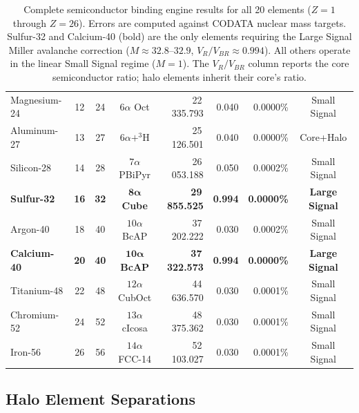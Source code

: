 \begin{table}[htbp]
\begin{tabular}{l c c c r r r c}
    Magnesium-24 & 12 & 24 & $6\alpha$ Oct     & 22\,335.793 & 0.040 & 0.0000\% & Small Signal \\
    Aluminum-27  & 13 & 27 & $6\alpha + ^3$H   & 25\,126.501 & 0.040 & 0.0000\% & Core+Halo \\
    Silicon-28   & 14 & 28 & $7\alpha$ PBiPyr  & 26\,053.188 & 0.050 & 0.0002\% & Small Signal \\
    \textbf{Sulfur-32}   & \textbf{16} & \textbf{32} & $\mathbf{8\alpha}$ \textbf{Cube} & \textbf{29\,855.525} & \textbf{0.994} & \textbf{0.0000\%} & \textbf{Large Signal} \\
    Argon-40     & 18 & 40 & $10\alpha$ BcAP   & 37\,202.222 & 0.030 & 0.0002\% & Small Signal \\
    \textbf{Calcium-40} & \textbf{20} & \textbf{40} & $\mathbf{10\alpha}$ \textbf{BcAP} & \textbf{37\,322.573} & \textbf{0.994} & \textbf{0.0000\%} & \textbf{Large Signal} \\
    Titanium-48  & 22 & 48 & $12\alpha$ CubOct & 44\,636.570 & 0.030 & 0.0001\% & Small Signal \\
    Chromium-52  & 24 & 52 & $13\alpha$ cIcosa & 48\,375.362 & 0.030 & 0.0001\% & Small Signal \\
    Iron-56      & 26 & 56 & $14\alpha$ FCC-14 & 52\,103.027 & 0.030 & 0.0001\% & Small Signal \\
    \hline\hline
    \end{tabular}
    \caption{Complete semiconductor binding engine results for all 20 elements ($Z=1$ through $Z=26$). Errors are computed against CODATA nuclear mass targets. Sulfur-32 and Calcium-40 (bold) are the only elements requiring the Large Signal Miller avalanche correction ($M \approx 32.8$--$32.9$, $V_R/V_{BR} \approx 0.994$). All others operate in the linear Small Signal regime ($M = 1$). The $V_R/V_{BR}$ column reports the core semiconductor ratio; halo elements inherit their core's ratio.}
    \label{tab:mass_summary}
\end{table}

\subsection*{Halo Element Separations}

